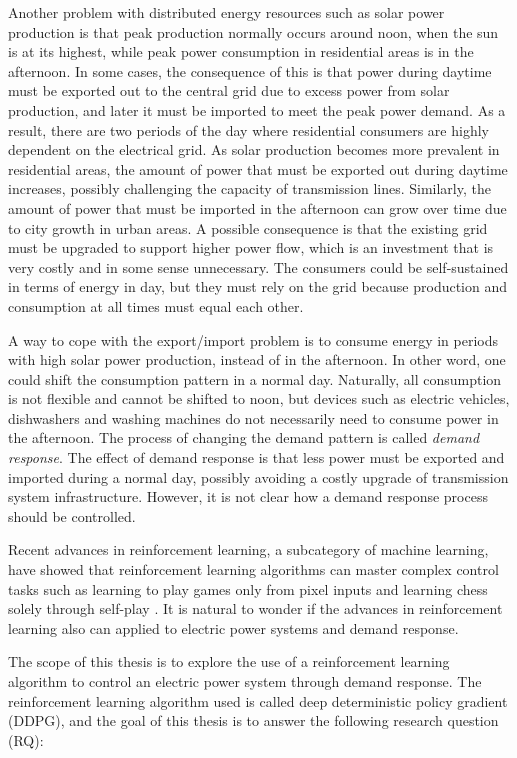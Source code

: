 \documentclass[class=book, crop=false]{standalone}
\begin{document}
Another problem with distributed energy resources such as solar power production is that peak production normally occurs around noon, when the sun is at its highest, while peak power consumption in residential areas is in the afternoon. In some cases, the consequence of this is that power during daytime must be exported out to the central grid due to excess power from solar production, and later it must be imported to meet the peak power demand. As a result, there are two periods of the day where residential consumers are highly dependent on the electrical grid. As solar production becomes more prevalent in residential areas, the amount of power that must be exported out during daytime increases, possibly challenging the capacity of transmission lines. Similarly, the amount of power that must be imported in the afternoon can grow over time due to city growth in urban areas. A possible consequence is that the existing grid must be upgraded to support higher power flow, which is an investment that is very costly and in some sense unnecessary. The consumers could be self-sustained in terms of energy in day, but they must rely on the grid because production and consumption at all times must equal each other.

A way to cope with the export/import problem is to consume energy in periods with high solar power production, instead of in the afternoon. In other word, one could shift the consumption pattern in a normal day. Naturally, all consumption is not flexible and cannot be shifted to noon, but devices such as electric vehicles, dishwashers and washing machines do not necessarily need to consume power in the afternoon. The process of changing the demand pattern is called \textit{demand response}. The effect of demand response is that less power must be exported and imported during a normal day, possibly avoiding a costly upgrade of transmission system infrastructure. However, it is not clear how a demand response process should be controlled. 

Recent advances in reinforcement learning, a subcategory of machine learning, have showed that  reinforcement learning algorithms can master complex control tasks such as learning to play games only from pixel inputs and learning chess solely through self-play \cite{DQN_Mnih_et_al_2013}\cite{alphazero}. It is natural to wonder if the advances in reinforcement learning also can applied to electric power systems and demand response.

The scope of this thesis is to explore the use of a reinforcement learning algorithm to control an electric power system through demand response. The reinforcement learning algorithm used is called deep deterministic policy gradient (DDPG), and the goal of this thesis is to answer the following research question (RQ):
\end{document}
